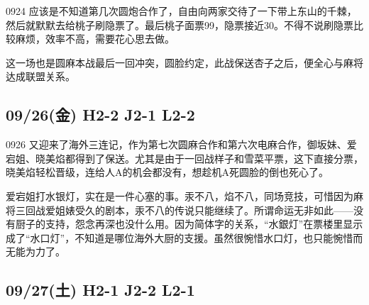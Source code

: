 0924 应该是不知道第几次圆炮合作了，自由向两家交待了一下带上东山的千棘，然后就默默去给桃子刷隐票了。最后桃子面票99，隐票接近30。不得不说刷隐票比较麻烦，效率不高，需要花心思去做。

这一场也是圆麻本战最后一回冲突，圆脸约定，此战保送杏子之后，便全心与麻将达成联盟关系。

\subsection{09/26(金) H2-2 J2-1 L2-2}


0926 又迎来了海外三连记，作为第七次圆麻合作和第六次电麻合作，御坂妹、爱宕姐、晓美焰都得到了保送。尤其是由于一回战样子和雪菜平票，这下直接分票，晓美焰轻松晋级，连给人A的机会都没有，想趁机A死圆脸的倒也死心了。

爱宕姐打水银灯，实在是一件心塞的事。汞不八，焰不八，同场竞技，可惜因为麻将三回战爱姐婊受久的剧本，汞不八的传说只能继续了。所谓命运无非如此——没有厨子的支持，怨念再深也没什么用。因为简体字的关系，“水銀灯”在票楼里显示成了“水口灯”，不知道是哪位海外大厨的支援。虽然很惋惜水口灯，也只能惋惜而无能为力了。

\subsection{09/27(土) H2-1 J2-2 L2-1}

